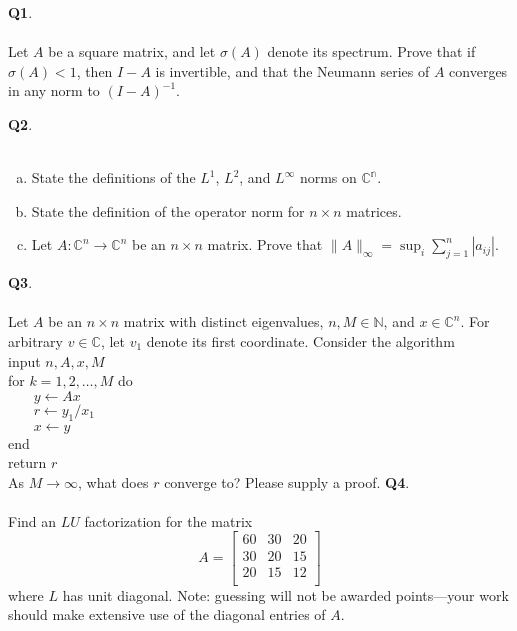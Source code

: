 \documentclass[12pt, oneside]{amsart}
\begin{document}
\vfill


\newpage
\noindent
\textbf{Q1}. \\ \\ 
Let $A$ be a square matrix, and let $\sigma(A)$ denote its spectrum. Prove that
if $\sigma(A) < 1$, then $I-A$ is invertible, and that the Neumann series of $A$ converges in any norm to $(I - A)^{-1}$. \\
\newpage

\noindent
\textbf{Q2}.\\ \\ 
\begin{enumerate}[a)]
\item State the definitions of the $L^1$, $L^2$, and $L^\infty$ norms on $\mathbb{C^n}$.
\vspace{2in}
\item State the definition of the operator norm for $n \times n$ matrices.
\vspace{2in}
\item Let $A : \mathbb{C}^n \to \mathbb{C}^n$ be an $n \times n$ matrix. Prove that
$ \| A \|_{\infty} = \sup_i \sum_{j = 1}^n | a_{ij} | $.
\end{enumerate}

\newpage

\noindent
\textbf{Q3}. \\ \\ 
Let $A$ be an $n \times n$ matrix with distinct eigenvalues, $n, M \in
\mathbb{N}$, and $x \in \mathbb{C}^n$. For arbitrary $v \in \mathbb{C}$, let
$v_1$ denote its first coordinate. Consider the algorithm 
\vspace{0.1in}\\
\noindent
input $n,A,x,M$ \\
for $k=1,2,\ldots,M$ do \\
$\phantom{bobo}y \leftarrow Ax$ \\
$\phantom{bobo}r \leftarrow y_1/x_1$ \\
$\phantom{bobo} x \leftarrow y$ \\
end \\
return $r$ 
\vspace{0.3in} \\
\noindent
As $M \to \infty$, what does $r$ converge to? Please supply a proof. 
\newpage
\noindent
\textbf{Q4}. \\ \\ 
\noindent
Find an $LU$ factorization for the matrix
\begin{equation*}
A = \begin{bmatrix}
60 & 30 & 20 \\
30 & 20 & 15 \\
20 & 15 & 12 \\
\end{bmatrix}
\end{equation*}
where $L$ has unit diagonal. Note: guessing will not be awarded points---your work should make extensive use of the diagonal entries of $A$. 
\end{document}
